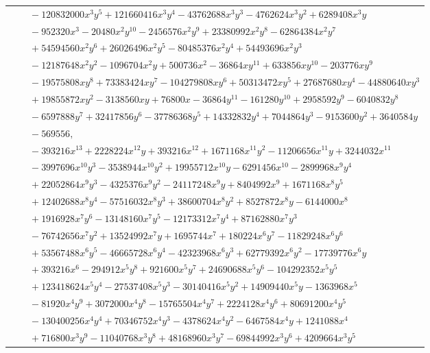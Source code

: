 \documentclass[11pt]{article}
\begin{document}
\begin{longtable}{@{}ll@{}}
 & $\quad -120832000x^{3}y^{5}+121660416x^{3}y^{4}-43762688x^{3}y^{3}-4762624x^{3}y^{2}+6289408x^{3}y$\\
 & $\quad -952320x^{3}-20480x^{2}y^{10}-2456576x^{2}y^{9}+23380992x^{2}y^{8}-62864384x^{2}y^{7}$\\
 & $\quad +54594560x^{2}y^{6}+26026496x^{2}y^{5}-80485376x^{2}y^{4}+54493696x^{2}y^{3}$\\
 & $\quad -12187648x^{2}y^{2}-1096704x^{2}y+500736x^{2}-36864xy^{11}+633856xy^{10}-203776xy^{9}$\\
 & $\quad -19575808xy^{8}+73383424xy^{7}-104279808xy^{6}+50313472xy^{5}+27687680xy^{4}-44880640xy^{3}$\\
 & $\quad +19855872xy^{2}-3138560xy+76800x-36864y^{11}-161280y^{10}+2958592y^{9}-6040832y^{8}$\\
 & $\quad -6597888y^{7}+32417856y^{6}-37786368y^{5}+14332832y^{4}+7044864y^{3}-9153600y^{2}+3640584y$\\
 & $\quad -569556,$\\
 & $\quad -393216x^{13}+2228224x^{12}y+393216x^{12}+1671168x^{11}y^{2}-11206656x^{11}y+3244032x^{11}$\\
 & $\quad -3997696x^{10}y^{3}-3538944x^{10}y^{2}+19955712x^{10}y-6291456x^{10}-2899968x^{9}y^{4}$\\
 & $\quad +22052864x^{9}y^{3}-4325376x^{9}y^{2}-24117248x^{9}y+8404992x^{9}+1671168x^{8}y^{5}$\\
 & $\quad +12402688x^{8}y^{4}-57516032x^{8}y^{3}+38600704x^{8}y^{2}+8527872x^{8}y-6144000x^{8}$\\
 & $\quad +1916928x^{7}y^{6}-13148160x^{7}y^{5}-12173312x^{7}y^{4}+87162880x^{7}y^{3}$\\
 & $\quad -76742656x^{7}y^{2}+13524992x^{7}y+1695744x^{7}+180224x^{6}y^{7}-11829248x^{6}y^{6}$\\
 & $\quad +53567488x^{6}y^{5}-46665728x^{6}y^{4}-42323968x^{6}y^{3}+62779392x^{6}y^{2}-17739776x^{6}y$\\
 & $\quad +393216x^{6}-294912x^{5}y^{8}+921600x^{5}y^{7}+24690688x^{5}y^{6}-104292352x^{5}y^{5}$\\
 & $\quad +123418624x^{5}y^{4}-27537408x^{5}y^{3}-30140416x^{5}y^{2}+14909440x^{5}y-1363968x^{5}$\\
 & $\quad -81920x^{4}y^{9}+3072000x^{4}y^{8}-15765504x^{4}y^{7}+2224128x^{4}y^{6}+80691200x^{4}y^{5}$\\
 & $\quad -130400256x^{4}y^{4}+70346752x^{4}y^{3}-4378624x^{4}y^{2}-6467584x^{4}y+1241088x^{4}$\\
 & $\quad +716800x^{3}y^{9}-11040768x^{3}y^{8}+48168960x^{3}y^{7}-69844992x^{3}y^{6}+4209664x^{3}y^{5}$\\

\end{longtable}
\end{document}
